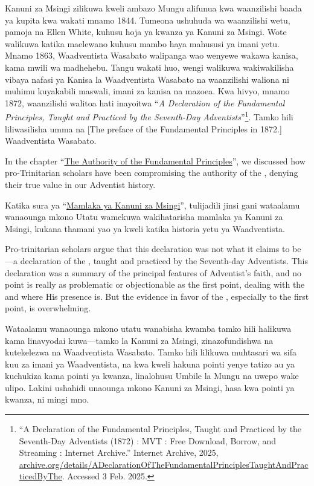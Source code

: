 Kanuni za Msingi zilikuwa kweli ambazo Mungu alifunua kwa waanzilishi baada ya kupita kwa wakati mnamo 1844. Tumeona ushuhuda wa waanzilishi wetu, pamoja na Ellen White, kuhusu hoja ya kwanza ya Kanuni za Msingi. Wote walikuwa katika maelewano kuhusu mambo haya mahususi ya imani yetu. Mnamo 1863, Waadventista Wasabato walipanga wao wenyewe wakawa kanisa, kama mwili wa madhehebu. Tangu wakati huo, wengi walikuwa wakiwakilisha vibaya nafasi ya Kanisa la Waadventista Wasabato na waanzilishi waliona ni muhimu kuyakabili maswali,  imani za kanisa na mazoea. Kwa hivyo, mnamo 1872, waanzilishi walitoa hati inayoitwa “\textit{A Declaration of the Fundamental Principles, Taught and Practiced by the Seventh-Day Adventists}”\footnote{“A Declaration of the Fundamental Principles, Taught and Practiced by the Seventh-Day Adventists (1872) : MVT : Free Download, Borrow, and Streaming : Internet Archive.” Internet Archive, 2025, \href{https://archive.org/details/ADeclarationOfTheFundamentalPrinciplesTaughtAndPracticedByThe}{archive.org/details/ADeclarationOfTheFundamentalPrinciplesTaughtAndPracticedByThe}. Accessed 3 Feb. 2025.}. Tamko hili liliwasilisha umma na [The preface of the Fundamental Principles in 1872.] Waadventista Wasabato.


In the chapter “\hyperref[chap:authority]{The Authority of the Fundamental Principles}”, we discussed how pro-Trinitarian scholars have been compromising the authority of the , denying their true value in our Adventist history.


Katika sura ya “\hyperref[chap:authority]{Mamlaka ya Kanuni za Msingi}”, tulijadili jinsi gani wataalamu wanaounga mkono Utatu wamekuwa wakihatarisha mamlaka ya Kanuni za Msingi, kukana thamani yao ya kweli katika historia yetu ya Waadventista.


Pro-trinitarian scholars argue that this declaration was not what it claims to be—a declaration of the , taught and practiced by the Seventh-day Adventists. This declaration was a summary of the principal features of Adventist’s faith, and no point is really as problematic or objectionable as the first point, dealing with the  and where His presence is. But the evidence in favor of the , especially to the first point, is overwhelming.


Wataalamu wanaounga mkono utatu wanabisha kwamba tamko hili halikuwa kama linavyodai kuwa—tamko la Kanuni za Msingi, zinazofundishwa na kutekelezwa na Waadventista Wasabato. Tamko hili lilikuwa muhtasari wa sifa kuu za imani ya Waadventista, na kwa kweli hakuna pointi yenye tatizo au ya kuchukiza kama pointi ya kwanza, linalohusu Umbile la Mungu na uwepo wake ulipo. Lakini ushahidi unaounga mkono Kanuni za Msingi, hasa kwa pointi ya kwanza, ni mingi mno.


